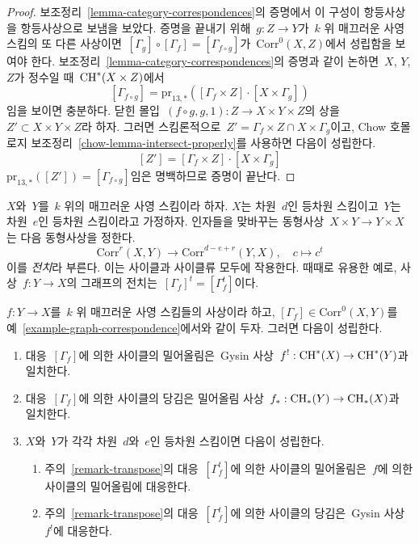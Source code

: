 \begin{proof}
보조정리\  \ref{lemma-category-correspondences}의 증명에서 이 구성이
항등사상을 항등사상으로 보냄을 보았다. 증명을 끝내기 위해\ 
$g : Z \to Y$가\  $k$ 위 매끄러운 사영 스킴의 또 다른 사상이면\ 
$[\Gamma_g] \circ [\Gamma_f] = [\Gamma_{f \circ g}]$가\ 
$\text{Corr}^0(X, Z)$에서 성립함을 보여야 한다.
보조정리\  \ref{lemma-category-correspondences}의 증명과 같이 논하면\ 
$X$, $Y$, $Z$가 정수일 때\  $\mathop{\mathrm{CH}}\nolimits^*(X \times Z)$에서
$$
[\Gamma_{f \circ g}] =
\text{pr}_{13, *}([\Gamma_f \times Z] \cdot [X \times \Gamma_g])
$$
임을 보이면 충분하다. 닫힌 몰입\ 
$(f \circ g, g, 1) : Z \to X \times Y \times Z$의 상을\ 
$Z' \subset X \times Y \times Z$라 하자. 그러면 스킴론적으로\ 
$Z' = \Gamma_f \times Z \cap X \times \Gamma_g$이고,
Chow 호몰로지 보조정리\  \ref{chow-lemma-intersect-properly}를 사용하면
다음이 성립한다.
$$
[Z'] = [\Gamma_f \times Z] \cdot [X \times \Gamma_g]
$$
$\text{pr}_{13, *}([Z']) = [\Gamma_{f \circ g}]$임은 명백하므로
증명이 끝난다.
\end{proof}

\begin{remark}
\label{remark-transpose}
$X$와\  $Y$를\  $k$ 위의 매끄러운 사영 스킴이라 하자.
$X$는 차원\  $d$인 등차원 스킴이고\  $Y$는 차원\  $e$인 등차원
스킴이라고 가정하자. 인자들을 맞바꾸는 동형사상\ 
$X \times Y \to Y \times X$는 다음 동형사상을 정한다.
$$
\text{Corr}^r(X, Y) \longrightarrow \text{Corr}^{d - e + r}(Y, X),\quad
c \longmapsto c^t
$$
이를 {\it 전치}라 부른다. 이는 사이클과 사이클류 모두에 작용한다.
때때로 유용한 예로, 사상\  $f : Y \to X$의 그래프의 전치는\ 
$[\Gamma_f]^t = [\Gamma_f^t]$이다.
\end{remark}

\begin{lemma}
\label{lemma-functor-and-cycles}
$f : Y \to X$를\  $k$ 위 매끄러운 사영 스킴들의 사상이라 하고,
$[\Gamma_f] \in \text{Corr}^0(X, Y)$를 예\ 
\ref{example-graph-correspondence}에서와 같이 두자. 그러면 다음이 성립한다.
\begin{enumerate}
\item 대응\  $[\Gamma_f]$에 의한 사이클의 밀어올림은\ 
Gysin 사상\  $f^! : \mathop{\mathrm{CH}}\nolimits^*(X) \to \mathop{\mathrm{CH}}\nolimits^*(Y)$과 일치한다.
\item 대응\  $[\Gamma_f]$에 의한 사이클의 당김은
밀어올림 사상\  $f_* : \mathop{\mathrm{CH}}\nolimits_*(Y) \to \mathop{\mathrm{CH}}\nolimits_*(X)$과 일치한다.
\item $X$와\  $Y$가 각각 차원\  $d$와\  $e$인 등차원 스킴이면 다음이 성립한다.
\begin{enumerate}
\item 주의\  \ref{remark-transpose}의 대응\  $[\Gamma_f^t]$에 의한
사이클의 밀어올림은\  $f$에 의한 사이클의 밀어올림에 대응한다.
\item 주의\  \ref{remark-transpose}의 대응\  $[\Gamma_f^t]$에 의한
사이클의 당김은\  Gysin 사상\  $f^!$에 대응한다.
\end{enumerate}
\end{enumerate}
\end{lemma}

